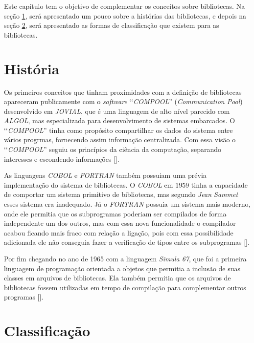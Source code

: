 Este capítulo tem o objetivo de complementar os conceitos sobre bibliotecas. Na seção
\ref{section:historia_das_biblioteca}, será apresentado um pouco sobre a histórias das bibliotecas,
e depois na seção \ref{section:classificação_das_bibliotecas}, será apresentado as formas de
classificação que existem para as bibliotecas.


\section{História}
\label{section:historia_das_biblioteca}

Os primeiros conceitos que tinham proximidades com a definição de bibliotecas apareceram publicamente
com o \emph{software} ‘‘\emph{COMPOOL}'' (\emph{Communication Pool}) desenvolvido em \emph{JOVIAL},
que é uma linguagem de alto nível parecido com \emph{ALGOL}, mas especializada para desenvolvimento
de sistemas embarcados. O ‘‘\emph{COMPOOL}'' tinha como propósito compartilhar os dados do
sistema entre vários progrmas, fornecendo assim informação centralizada. Com essa visão o
‘‘\emph{COMPOOL}'' seguiu os princípios da ciência da computação, separando interesses e
escondendo informações [].

As linguagens \emph{COBOL} e \emph{FORTRAN} também possuiam uma prévia implementação do sistema de
bibliotecas. O \emph{COBOL} em 1959 tinha a capacidade de comportar um sistema primitivo de
bibliotecas, mas segundo \emph{Jean Sammet} esses sistema era inadequado. Já o
\emph{FORTRAN} possuia um sistema mais moderno, onde ele permitia que os subprogramas poderiam ser
compilados de forma independente um dos outros, mas com essa nova funcionalidade o compilador acabou
ficando mais fraco com relação a ligação, pois com essa possibilidade adicionada ele não conseguia
fazer a verificação de tipos entre os subprogramas [].

Por fim chegando no ano de 1965 com a linguagem \emph{Simula 67}, que foi a primeira linguagem
de programação orientada a objetos que permitia a inclusão de suas classes em arquivos de bibliotecas.
Ela também permitia que os arquivos de bibliotecas fossem utilizadas em tempo de compilação para
complementar outros programas [].


\section{Classificação}
\label{section:classificação_das_bibliotecas}

